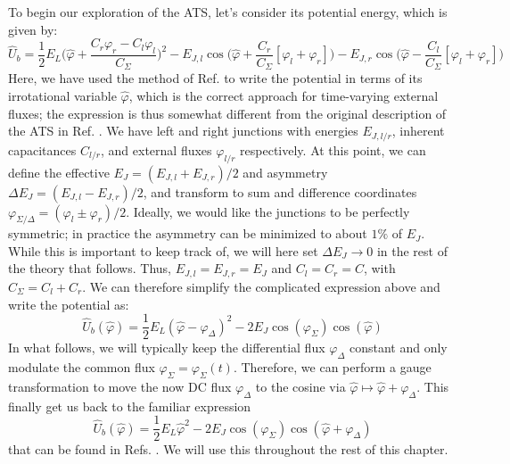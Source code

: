 \noindent To begin our exploration of the ATS, let's consider its potential energy, which is given by:
\begin{equation}
    \hat{U}_b = \frac{1}{2}E_L \bigg(\hat{\varphi} + \frac{C_r\varphi_r - C_l\varphi_l}{C_\Sigma}\bigg)^2 - E_{J,l}\cos\!\bigg(\hat{\varphi} + \frac{C_r}{C_\Sigma}[\varphi_l + \varphi_r]\bigg) - E_{J,r}\cos\!\bigg(\hat{\varphi} - \frac{C_l}{C_\Sigma}[\varphi_l + \varphi_r]\bigg)
\end{equation}
Here, we have used the method of Ref. \cite{you2019circuit} to write the potential in terms of its irrotational variable $\hat{\varphi}$, which is the correct approach for time-varying external fluxes; the expression is thus somewhat different from the original description of the ATS in Ref. \cite{lescanne2020exponential}. We have left and right junctions with energies $E_{J, l/r}$, inherent capacitances $C_{l/r}$, and external fluxes $\varphi_{l/r}$ respectively. At this point, we can define the effective $E_J = (E_{J,l} + E_{J,r})/2$ and asymmetry $\Delta E_J = (E_{J,l} - E_{J,r})/2$, and transform to sum and difference coordinates $\varphi_{\Sigma/\Delta} = (\varphi_l \pm \varphi_r)/2$.  Ideally, we would like the junctions to be perfectly symmetric; in practice the asymmetry can be minimized to about $1\%$ of $E_J$. While this is important to keep track of, we will here set $\Delta E_J \to 0$ in the rest of the theory that follows. Thus, $E_{J,l} = E_{J,r} = E_J$ and $C_l = C_r = C$, with $C_\Sigma = C_l + C_r$. We can therefore simplify the complicated expression above and write the potential as:
\begin{equation}
\hat{U}_b(\hat{\varphi}) = \frac{1}{2}E_L(\hat{\varphi} - \varphi_\Delta)^2 - 2E_J \cos(\varphi_\Sigma)\cos(\hat{\varphi})
\end{equation}
In what follows, we will typically keep the differential flux $\varphi_\Delta$ constant and only modulate the common flux $\varphi_\Sigma = \varphi_\Sigma(t)$. Therefore, we can perform a gauge transformation to move the now DC flux $\varphi_\Delta$ to the cosine via $\hat{\varphi} \mapsto \hat{\varphi} + \varphi_\Delta$. This finally get us back to the familiar expression
\begin{equation}
\hat{U}_b(\hat{\varphi}) = \frac{1}{2}E_L\hat{\varphi}^2 - 2E_J \cos(\varphi_\Sigma)\cos(\hat{\varphi} + \varphi_\Delta)
\end{equation}
that can be found in Refs. \cite{lescanne2020exponential, berdou2023one}. We will use this throughout the rest of this chapter.

